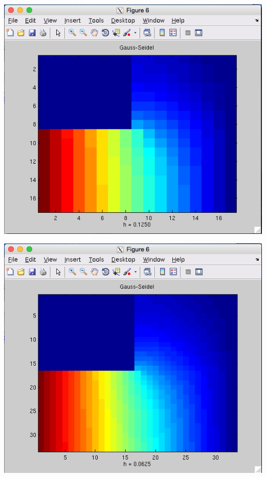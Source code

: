 \documentclass[11pt, oneside]{article}   	%
\begin{document}
\centerline{\includegraphics[scale = 0.55]{Gauss_h3.png}}

\centerline{\includegraphics[scale = 0.55]{Gauss_h4.png}}
\end{document}
